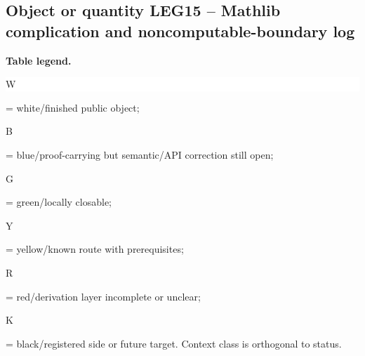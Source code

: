 \subsection*{Object or quantity LEG15 -- Mathlib complication and noncomputable-boundary log}
\hypertarget{objproof:LEG15}{}
\par\smallskip\noindent\begin{minipage}{0.99\linewidth}\footnotesize\raggedright\textbf{Table legend.} \colorbox{white}{\strut W} = white/finished public object; \colorbox{cyan!20}{\strut B} = blue/proof-carrying but semantic/API correction still open; \colorbox{green!18}{\strut G} = green/locally closable; \colorbox{yellow!25}{\strut Y} = yellow/known route with prerequisites; \colorbox{red!20}{\strut R} = red/derivation layer incomplete or unclear; \colorbox{black!18}{\strut K} = black/registered side or future target. Context class is orthogonal to status.\end{minipage}\par\vspace{0.25em}
